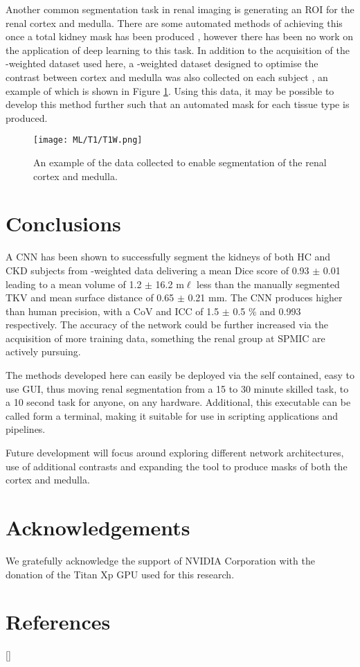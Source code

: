 Another common segmentation task in renal imaging is generating an \ac{ROI} for the renal cortex and medulla. There are some automated methods of achieving this once a total kidney mask has been produced \cite{cox_multiparametric_2017, morris_segmentation_2019}, however there has been no work on the application of deep learning to this task. In addition to the acquisition of the \ttwo-weighted dataset used here, a \tone-weighted dataset designed to optimise the contrast between cortex and medulla was also collected on each subject \cite{will_automated_2014}, an example of which is shown in Figure \ref{fig:ml_t1}. Using this data, it may be possible to develop this method further such that an automated mask for each tissue type is produced. 

\begin{figure}[H]
	\centering
	\texttt{[image: ML/T1/T1W.png]}
	\caption{An example of the data collected to enable segmentation of the renal cortex and medulla.}
	\label{fig:ml_t1}
\end{figure}

\newpage

\section{Conclusions}

A \ac{CNN} has been shown to successfully segment the kidneys of both \ac{HC} and \ac{CKD} subjects from \ttwo-weighted data delivering a mean Dice score of 0.93 $\pm$ 0.01 leading to a mean volume of 1.2 $\pm$ 16.2 m$\ell$ less than the manually segmented \ac{TKV} and mean surface distance of 0.65 $\pm$ 0.21 mm. The \ac{CNN} produces higher than human precision, with a \ac{CoV} and \ac{ICC} of 1.5 $\pm$ 0.5 \% and 0.993 respectively. The accuracy of the network could be further increased via the acquisition of more training data, something the renal group at \ac{SPMIC} are actively pursuing. 

The methods developed here can easily be deployed via the self contained, easy to use \ac{GUI}, thus moving renal segmentation from a 15 to 30 minute skilled task, to a 10 second task for anyone, on any hardware. Additional, this executable can be called form a terminal, making it suitable for use in scripting applications and pipelines.

Future development will focus around exploring different network architectures, use of additional contrasts and expanding the tool to produce masks of both the cortex and medulla.

\section{Acknowledgements}

We gratefully acknowledge the support of NVIDIA Corporation with the donation of the Titan Xp GPU used for this research.

\newpage
\section{References}
[\refname]{}
\printbibliography